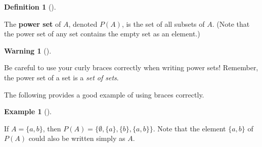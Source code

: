 \documentclass[10pt,]{book}
\newcommand{\terminology}[1]{\textbf{#1}}
\theoremstyle{plain}
\theoremstyle{definition}
\newtheorem{definition}[theorem]{Definition}
\theoremstyle{definition}
\newtheorem{warning}[theorem]{Warning}
\theoremstyle{definition}
\newtheorem{example}[theorem]{Example}
\theoremstyle{definition}
\numberwithin{equation}{section}
\begin{document}
\begin{definition}[{}]\label{definition-5}

        The \terminology{power set} of \(A\), denoted \(P(A)\), is the set of
        all subsets of \(A\). (Note that the power set of any set
        contains the empty set as an element.)
\label{notation-16}
\end{definition}
\begin{warning}[]\label{warning-2}

      Be careful to use your curly braces correctly when writing power sets!
      Remember, the power set of a set is a \emph{set of sets}.
\end{warning}
\par

    The following provides a good example of using braces correctly.
\begin{example}[]\label{example-3}

        If \(A=\{a,b\}\), then \(P(A)=\{\emptyset, \{a\}, \{b\}, \{a,b\}\}\). Note that the element \(\{a,b\}\) of \(P(A)\) could also be written simply as \(A\).
\end{example}
\end{document}
